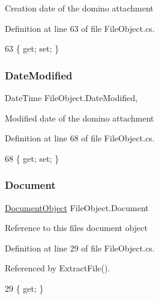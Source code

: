 Creation date of the domino attachment 



Definition at line 63 of file File\+Object.\+cs.


\begin{DoxyCode}
63 \{ \textcolor{keyword}{get}; \textcolor{keyword}{set}; \}
\end{DoxyCode}
\mbox{\label{class_file_object_a9a4c52e205bee3f8bdfa7040f465b6af}} 
\subsubsection{\texorpdfstring{Date\+Modified}{DateModified}}
{\footnotesize\ttfamily Date\+Time File\+Object.\+Date\+Modified\hspace{0.3cm}{\ttfamily [get]}, {\ttfamily [set]}}



Modified date of the domino attachment 



Definition at line 68 of file File\+Object.\+cs.


\begin{DoxyCode}
68 \{ \textcolor{keyword}{get}; \textcolor{keyword}{set}; \}
\end{DoxyCode}
\mbox{\label{class_file_object_a0c9650a6ae1efb95f8211f9fa3b883fe}} 
\subsubsection{\texorpdfstring{Document}{Document}}
{\footnotesize\ttfamily \mbox{\hyperlink{class_document_object}{Document\+Object}} File\+Object.\+Document\hspace{0.3cm}{\ttfamily [get]}}



Reference to this files document object 



Definition at line 29 of file File\+Object.\+cs.



Referenced by Extract\+File().


\begin{DoxyCode}
29 \{ \textcolor{keyword}{get}; \}
\end{DoxyCode}
\mbox{\label{class_file_object_ae25b58dc19def323da91a48e17ba13ed}} 
